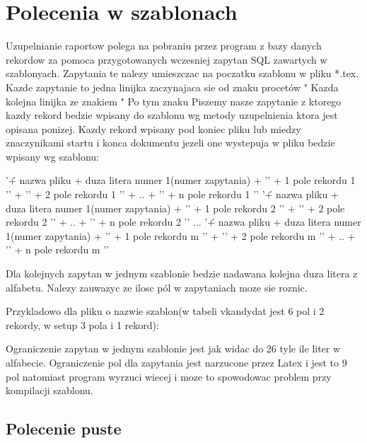\section{Polecenia w szablonach}
Uzupelnianie raportow polega na pobraniu przez program z bazy danych rekordow za pomoca przygotowanych wczesniej zapytan SQL zawartych w szablonyach.
Zapytania te nalezy umieszczac na poczatku szablonu w pliku *.tex. Kazde zapytanie to jedna linijka zaczynajaca sie od znaku procetów "%
Kazda kolejna linijka ze znakiem "%
Po tym znaku Piszemy nasze zapytanie z ktorego kazdy rekord bedzie wpisany do szablonu wg metody uzupelnienia ktora jest opisana ponizej.
Kazdy rekord wpisany pod koniec pliku lub miedzy znaczynikami startu i konca dokumentu jezeli one wystepuja w pliku bedzie wpisany wg szablonu:

'\' + nazwa pliku + duza litera numer 1(numer zapytania) + '{' + 1 pole rekordu 1 '}' + '{' + 2 pole rekordu 1  '}' + .. + '{' + n pole rekordu 1 '}'
'\' + nazwa pliku + duza litera numer 1(numer zapytania) + '{' + 1 pole rekordu 2 '}' + '{' + 2 pole rekordu 2  '}' + .. + '{' + n pole rekordu 2 '}'
...
'\' + nazwa pliku + duza litera numer 1(numer zapytania) + '{' + 1 pole rekordu m '}' + '{' + 2 pole rekordu m  '}' + .. + '{' + n pole rekordu m '}'

Dla kolejnych zapytan w jednym szablonie bedzie nadawana kolejna duza litera z alfabetu. Nalezy zauwazyc ze ilosc pól w zapytaniach moze sie roznic.

Przykladowo dla pliku o nazwie szablon(w tabeli vkandydat jest 6 pol i 2 rekordy, w setup 3 pola i 1 rekord):




Ograniczenie zapytan w jednym szablonie jest jak widac do 26 tyle ile liter w alfabecie.
Ograniczenie pol dla zapytania jest narzucone przez Latex i jest to 9 pol natomiast program wyrzuci wiecej i moze to spowodowac problem przy kompilacji szablonu.
\subsection{Polecenie puste}

